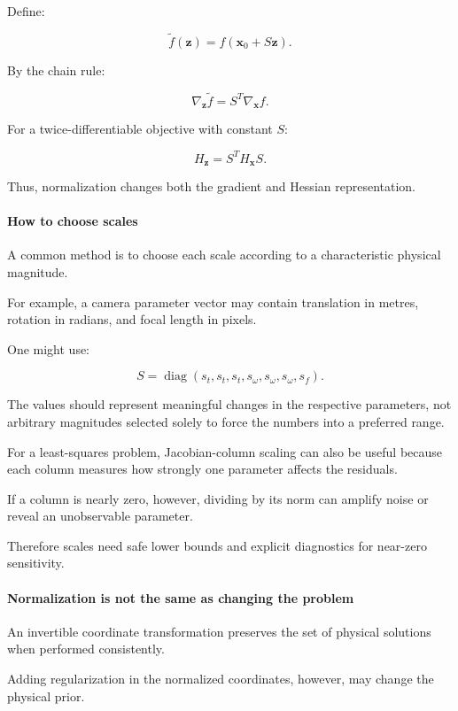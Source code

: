 Define:

\[
\tilde f(\mathbf z)=f(\mathbf x_0+S\mathbf z).
\]

By the chain rule:

\[
\boxed{ \nabla_{\mathbf z}\tilde f = S^T\nabla_{\mathbf x}f }.
\]

For a twice-differentiable objective with constant \(S\):

\[
\boxed{ H_{\mathbf z}=S^TH_{\mathbf x}S }.
\]

Thus, normalization changes both the gradient and Hessian representation.

\paragraph{How to choose scales}\label{02-foundations-ii-ch027-how-to-choose-scales}

A common method is to choose each scale according to a characteristic physical magnitude.

For example, a camera parameter vector may contain translation in metres, rotation in radians, and focal length in pixels.

One might use:

\[
S= \operatorname{diag} (s_t,s_t,s_t,s_\omega,s_\omega,s_\omega,s_f).
\]

The values should represent meaningful changes in the respective parameters, not arbitrary magnitudes selected solely to force the numbers into a preferred range.

For a least-squares problem, Jacobian-column scaling can also be useful because each column measures how strongly one parameter affects the residuals.

If a column is nearly zero, however, dividing by its norm can amplify noise or reveal an unobservable parameter.

Therefore scales need safe lower bounds and explicit diagnostics for near-zero sensitivity.

\paragraph{Normalization is not the same as changing the problem}\label{02-foundations-ii-ch027-normalization-is-not-the-same-as-changing-the-problem}

An invertible coordinate transformation preserves the set of physical solutions when performed consistently.

Adding regularization in the normalized coordinates, however, may change the physical prior.

